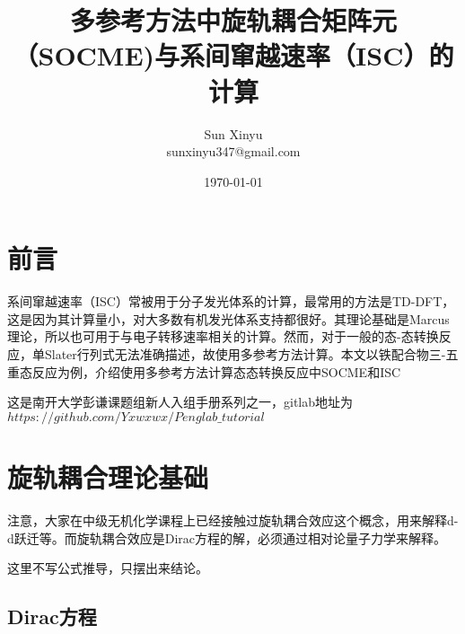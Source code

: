 \documentclass[12pt, a4paper, oneside]{ctexart}
\title{\textbf{多参考方法中旋轨耦合矩阵元（SOCME)与系间窜越速率（ISC）的计算}}
\author{Sun Xinyu\\sunxinyu347@gmail.com}
\date{\today}
\begin{document}
\maketitle

\setcounter{page}{0}
\maketitle
\thispagestyle{empty}

\newpage
{}
\setcounter{page}{1}
\tableofcontents
\newpage
\setcounter{page}{1}

\section{前言}

  系间窜越速率（ISC）常被用于分子发光体系的计算，最常用的方法是TD-DFT，这是因为其计算量小，对大多数有机发光体系支持都很好。其理论基础是Marcus理论，所以也可用于与电子转移速率相关的计算。然而，对于一般的态-态转换反应，单Slater行列式无法准确描述，故使用多参考方法计算。本文以铁配合物三-五重态反应为例，介绍使用多参考方法计算态态转换反应中SOCME和ISC\par
这是南开大学彭谦课题组新人入组手册系列之一，gitlab地址为$https://github.com/Yxwxwx/Penglab\_tutorial$
\newpage

\section{旋轨耦合理论基础}

  注意，大家在中级无机化学课程上已经接触过旋轨耦合效应这个概念，用来解释d-d跃迁等。而旋轨耦合效应是Dirac方程的解，必须通过相对论量子力学来解释。\par
  这里不写公式推导，只摆出来结论。

\subsection{Dirac方程}
\end{document}
